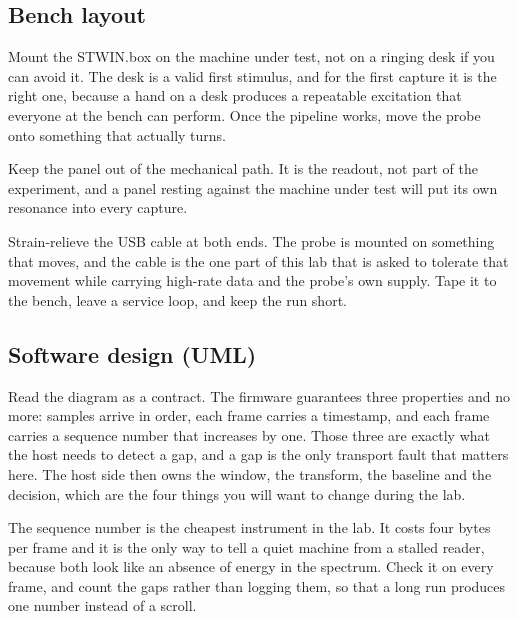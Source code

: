 \subsection*{Bench layout}


Mount the STWIN.box on the machine under test, not on a ringing desk if you can avoid it. The desk is a valid first stimulus, and for the first capture it is the right one, because a hand on a desk produces a repeatable excitation that everyone at the bench can perform. Once the pipeline works, move the probe onto something that actually turns.

Keep the panel out of the mechanical path. It is the readout, not part of the experiment, and a panel resting against the machine under test will put its own resonance into every capture.

Strain-relieve the USB cable at both ends. The probe is mounted on something that moves, and the cable is the one part of this lab that is asked to tolerate that movement while carrying high-rate data and the probe's own supply. Tape it to the bench, leave a service loop, and keep the run short.

\subsection*{Software design (UML)}


Read the diagram as a contract. The firmware guarantees three properties and no more: samples arrive in order, each frame carries a timestamp, and each frame carries a sequence number that increases by one. Those three are exactly what the host needs to detect a gap, and a gap is the only transport fault that matters here. The host side then owns the window, the transform, the baseline and the decision, which are the four things you will want to change during the lab.

The sequence number is the cheapest instrument in the lab. It costs four bytes per frame and it is the only way to tell a quiet machine from a stalled reader, because both look like an absence of energy in the spectrum. Check it on every frame, and count the gaps rather than logging them, so that a long run produces one number instead of a scroll.

